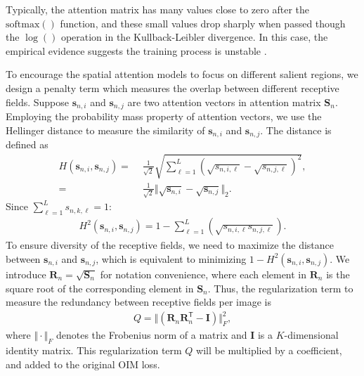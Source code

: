 \noindent Typically, the attention matrix has many values close to zero after the $\text{softmax}()$ function, and these small values drop sharply when passed though the $\log()$ operation in the Kullback-Leibler divergence. In this case, the empirical evidence suggests the training process is unstable \cite{lin2017structured}. 

To encourage the spatial attention models to focus on different salient regions, we design a penalty term which measures the overlap between different receptive fields.
Suppose $\mathbf{s}_{n,i}$ and $\mathbf{s}_{n,j}$ are two attention vectors in attention matrix $\mathbf{S}_n$.  
Employing the probability mass property of attention vectors, we use the Hellinger distance \cite{beran1977minimum} to measure the similarity of $\mathbf{s}_{n,i}$ and $\mathbf{s}_{n,j}$. The distance is defined as
%
\begin{align}
   H(\mathbf{s}_{n,i}, \mathbf{s}_{n,j}) = &\,\,  \frac{1}{\sqrt2} \sqrt{\sum_{\ell=1}^L (\sqrt { s_{n,i,\ell}} - \sqrt {s_{n,j,\ell}})^2}, \\
            = &\,\,  \frac{1}{\sqrt2} \Vert \sqrt {\mathbf{s}_{n,i}} - \sqrt {\mathbf{s}_{n,j}} \Vert_2.
\end{align}
Since $\sum_{\ell=1}^L s_{n,k,\ell}=1$:
\begin{align}
   H^2(\mathbf{s}_{n,i}, \mathbf{s}_{n,j}) = 1 - \sum_{\ell=1}^L (\sqrt{s_{n,i,\ell} s_{n,j,\ell}}).
\end{align}
To ensure diversity of the receptive fields, we need to maximize the distance between $\mathbf{s}_{n,i}$ and $\mathbf{s}_{n,j}$, which is equivalent to minimizing $1-H^2(\mathbf{s}_{n,i}, \mathbf{s}_{n,j})$. We introduce $\mathbf{R}_n = \sqrt{ \mathbf{S}_n }$ for notation convenience, where each element in $\mathbf{R}_n$ is the square root of the corresponding element in $\mathbf{S}_n$. Thus, the regularization term to measure the redundancy between receptive fields per image is
\begin{align}
   Q = \Vert ( \mathbf{R}_n \mathbf{R}_n^\mathsf{T}-\mathbf{I}) \Vert_F^2,
\end{align}
where $\Vert \cdot \Vert_F$ denotes the Frobenius norm of a matrix and $\mathbf{I}$ is a $K$-dimensional identity matrix. This regularization term $Q$ will be multiplied by a coefficient, and added to the original OIM loss. %

